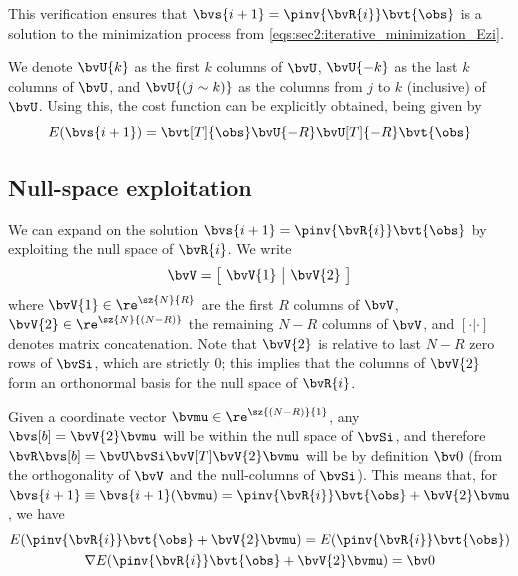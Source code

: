 {This verification ensures that $\bvs{i+1} = \pinv{\bvR{i}} \bvt{\obs}$ is a solution to the minimization process from \cref{eqs:sec2:iterative_minimization_Ezi}.

We denote $\bvU{k}$ as the first $k$ columns of $\bvU$, $\bvU{-k}$ as the last $k$ columns of $\bvU$, and $\bvU{(j\sim k)}$ as the columns from $j$ to $k$ (inclusive) of $\bvU$. Using this, the cost function can be explicitly obtained, being given by
\begin{equation}
	E(\bvs{i+1}) = \bvt[T]{\obs} \bvU{-R} \bvU[T]{-R} \bvt{\obs}
	\label{eq:sec2:cost_func_explicit_svd}
\end{equation}

\subsection{Null-space exploitation}
\label{subsec:sec3:null-space_exploitation}

We can expand on the solution $\bvs{i+1} = \pinv{\bvR{i}} \bvt{\obs}$ by exploiting the null space of $\bvR{i}$. We write
\begin{equation}
	\bvV = \left[\begin{array}{c|c}
		\!\bvV{1} & \bvV{2}\!
	\end{array}\right]
\end{equation}
where $\bvV{1}\in \re^{\sz{N}{R}}$ are the first $R$ columns of $\bvV$, $\bvV{2} \in \re^{\sz{N}{(N-R)}}$ the remaining $N-R$ columns of $\bvV$, and $[\cdot|\cdot]$ denotes matrix concatenation. Note that $\bvV{2}$ is relative to last $N-R$ zero rows of $\bvSi$, which are strictly $0$; this implies that the columns of $\bvV{2}$ form an orthonormal basis for the null space of $\bvR{i}$.

Given a coordinate vector $\bvmu \in \re^{\sz{(N-R)}{1}}$, any $\bvs[b] = \bvV{2} \bvmu$ will be within the null space of $\bvSi$, and therefore $\bvR \bvs[b] = \bvU \bvSi \bvV[T] \bvV{2} \bvmu$ will be by definition $\bv0$ (from the orthogonality of $\bvV$ and the null-columns of $\bvSi$). This means that, for $\bvs{i+1} \equiv \bvs{i+1}(\bvmu) = \pinv{\bvR{i}} \bvt{\obs} + \bvV{2} \bvmu$, we have
\begin{subequations}
	\begin{gather}
		E(\pinv{\bvR{i}} \bvt{\obs} + \bvV{2} \bvmu) = E(\pinv{\bvR{i}} \bvt{\obs}) \\
		\nabla E(\pinv{\bvR{i}} \bvt{\obs} + \bvV{2} \bvmu) = \bv0
	\end{gather}
	\label{eq:sec3:mu_doesnt_affect_cost-or-gradient}
\end{subequations}

}
